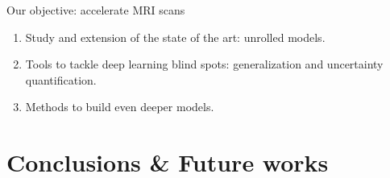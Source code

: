 \documentclass[aspectratio=169,xcolor=dvipsnames]{beamer}
\begin{document}
\begin{frame}{Our objective: accelerate MRI scans}
    \begin{enumerate}
        \item Study and extension of the state of the art: unrolled models.
        \item Tools to tackle deep learning blind spots: generalization and uncertainty quantification.
        \item Methods to build even deeper models.
    \end{enumerate}

\end{frame}






% 





\section{Conclusions \& Future works}
\end{document}
